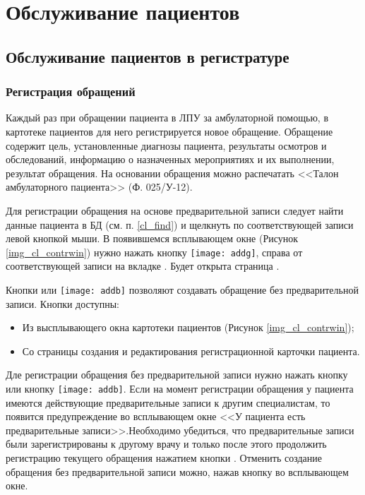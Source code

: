 \newpage
\section{Обслуживание пациентов}

\subsection{Обслуживание пациентов в регистратуре}
\subsubsection {Регистрация обращений} \label{pol_obr}

Каждый раз при обращении пациента в ЛПУ за амбулаторной помощью, в картотеке пациентов для него регистрируется новое обращение. Обращение содержит цель, установленные диагнозы пациента, результаты осмотров и обследований, информацию о назначенных мероприятиях и их выполнении, результат обращения. На основании обращения можно распечатать <<Талон амбулаторного пациента>> (Ф. 025\slash У-12).

Для регистрации обращения на основе предварительной записи следует найти данные пациента в БД (см. п. \ref{cl_find}) и щелкнуть по соответствующей записи левой кнопкой мыши. В появившемся всплывающем окне (Рисунок \ref{img_cl_contrwin}) нужно нажать кнопку \texttt{[image: addg]}, справа от соответствующей записи на вкладке . Будет открыта страница .

Кнопки  или \texttt{[image: addb]} позволяют создавать обращение без предварительной записи. Кнопки доступны:
\begin{itemize}
 \item Из высплывающего окна картотеки пациентов (Рисунок \ref{img_cl_contrwin});
 \item Со страницы создания и редактирования регистрационной карточки пациента. 
\end{itemize}

Дле регистрации обращения без предварительной записи нужно нажать кнопку  или кнопку \texttt{[image: addb]}. Если на момент регистрации обращения у пациента имеются действующие предварительные записи к другим специалистам, то появится предупреждение во всплывающем окне <<У пациента есть предварительные записи>>.Необходимо убедиться, что предварительные записи были зарегистрированы к другому врачу и только после этого продолжить регистрацию текущего обращения нажатием кнопки . Отменить создание обращения без предварительной записи можно, нажав кнопку   во всплывающем окне.

